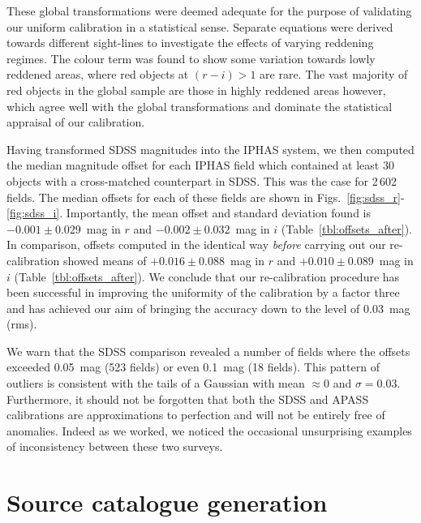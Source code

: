 \documentclass[useAMS,usenatbib]{mn2e}
\begin{document}
These global transformations were deemed adequate
for the purpose of validating our uniform calibration in a statistical sense.
Separate equations were derived towards different sight-lines
to investigate the effects of varying reddening regimes.
The colour term was found 
to show some variation towards lowly reddened areas,
where red objects at $(r-i) > 1$ are rare.
The vast majority of red objects in the global sample
are those in highly reddened areas however,
which agree well with the global transformations
and dominate the statistical appraisal of our calibration.

Having transformed SDSS magnitudes into the IPHAS system,
we then computed the median magnitude offset for each IPHAS field
which contained at least 30 objects with a cross-matched counterpart
in SDSS.  This was the case for 2\,602 fields.
The median offsets for each of these fields
are shown in Figs.~\ref{fig:sdss_r}-\ref{fig:sdss_i}.
Importantly, the mean offset and standard deviation found 
is $-0.001\pm0.029$~mag in $r$
and $-0.002\pm0.032$~mag in $i$ (Table~\ref{tbl:offsets_after}).
In comparison, offsets computed in the identical way
\emph{before} carrying out our re-calibration showed means
of $+0.016\pm0.088$~mag in $r$ and $+0.010\pm0.089$~mag in $i$ (Table~\ref{tbl:offsets_after}).
We conclude that our re-calibration procedure has
been successful in improving the
uniformity of the calibration by a factor three
and has achieved our aim of bringing the
accuracy down to the level of 0.03~mag (rms).

We warn that the SDSS comparison revealed a number of fields where the offsets
exceeded 0.05~mag (523 fields) or even 0.1~mag (18 fields).
This pattern of outliers is consistent with the tails of a Gaussian
with mean $\approx0$ and $\sigma=0.03$.  Furthermore, it should not
be forgotten that both the SDSS and APASS calibrations are approximations to
perfection and will not be entirely free of anomalies.  Indeed as we worked, 
we noticed the occasional unsurprising examples of inconsistency between these 
two surveys.  

\section{Source catalogue generation}
\label{sec:catalogue}
\end{document}
